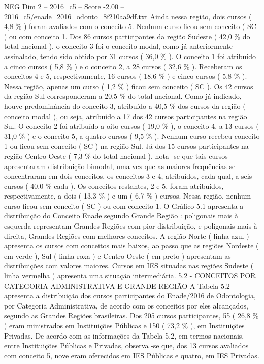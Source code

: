 \begin{textsample}{NEG Dim 2 – 2016\_c5 – Score -2.00 – 2016\_c5/enade\_2016\_odonto\_8f210aa9df.txt}
Ainda nessa região, dois cursos ( 4,8 \% ) foram avaliados com o conceito 5.
Nenhum curso ficou sem conceito ( SC ) ou com conceito 1.
Dos 86 cursos participantes da região Sudeste ( 42,0 \% do total nacional ), o conceito 3 foi o conceito modal, como já anteriormente assinalado, tendo sido obtido por 31 cursos ( 36,0 \% ).
O conceito 1 foi atribuído a cinco cursos ( 5,8 \% ) e o conceito 2, a 28 cursos ( 32,6 \% ).
Receberam os conceitos 4 e 5, respectivamente, 16 cursos ( 18,6 \% ) e cinco cursos ( 5,8 \% ).
Nessa região, apenas um curso ( 1,2 \% ) ficou sem conceito ( SC ).
Os 42 cursos da região Sul corresponderam a 20,5 \% do total nacional.
Como já indicado, houve predominância do conceito 3, atribuído a 40,5 \% dos cursos da região ( conceito modal ), ou seja, atribuído a 17 dos 42 cursos participantes na região Sul.
O conceito 2 foi atribuído a oito cursos ( 19,0 \% ), o conceito 4, a 13 cursos ( 31,0 \% ) e o conceito 5, a quatro cursos ( 9,5 \% ).
Nenhum curso recebeu conceito 1 ou ficou sem conceito ( SC ) na região Sul.
Já dos 15 cursos participantes na região Centro-Oeste ( 7,3 \% do total nacional ), nota -se que tais cursos apresentaram distribuição bimodal, uma vez que as maiores frequências se concentraram em dois conceitos, os conceitos 3 e 4, atribuídos, cada qual, a seis cursos ( 40,0 \% cada ).
Os conceitos restantes, 2 e 5, foram atribuídos, respectivamente, a dois ( 13,3 \% ) e um ( 6,7 \% ) cursos.
Nessa região, nenhum curso ficou sem conceito ( SC ) ou com conceito 1.
O Gráfico 5.1 apresenta a distribuição do Conceito Enade segundo Grande Região : poligonais mais à esquerda representam Grandes Regiões com pior distribuição, e poligonais mais à direita, Grandes Regiões com melhores conceitos.
A região Norte ( linha azul ) apresenta os cursos com conceitos mais baixos, ao passo que as regiões Nordeste ( em verde ), Sul ( linha roxa ) e Centro-Oeste ( em preto ) apresentam as distribuições com valores maiores.
Cursos em IES situadas nas regiões Sudeste ( linha vermelha ) apresenta uma situação intermediária. 5.2 - CONCEITOS POR CATEGORIA ADMINISTRATIVA E GRANDE REGIÃO A Tabela 5.2 apresenta a distribuição dos cursos participantes do Enade/2016 de Odontologia, por Categoria Administrativa, de acordo com os conceitos por eles alcançados, segundo as Grandes Regiões brasileiras.
Dos 205 cursos participantes, 55 ( 26,8 \% ) eram ministrados em Instituições Públicas e 150 ( 73,2 \% ), em Instituições Privadas.
De acordo com as informações da Tabela 5.2, em termos nacionais, entre Instituições Públicas e Privadas, observa -se que, dos 13 cursos avaliados com conceito 5, nove eram oferecidos em IES Públicas e quatro, em IES Privadas.

\end{textsample}
